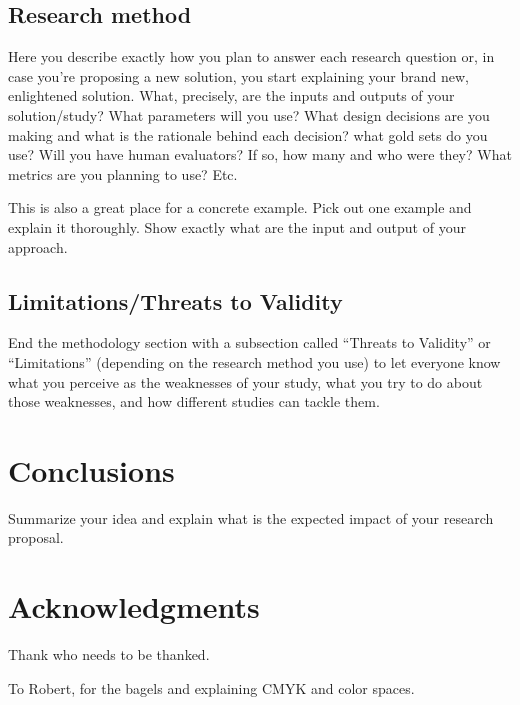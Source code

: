 \documentclass[sigconf,screen]{acmart}
\begin{document}
\subsection{Research method}

Here you describe exactly how you plan to answer each research question or, in case you're proposing a new solution, you start explaining your brand new, enlightened solution. What, precisely, are the inputs and outputs of your solution/study? What parameters will you use? What design decisions are you making and what is the rationale behind each decision? what gold sets do you use? Will you have human evaluators? If so, how many and who were they? What metrics are you planning to use?  Etc.

This is also a great place for a concrete example. Pick out one example and explain it thoroughly. Show exactly what are the input and output of your approach.

\subsection{Limitations/Threats to Validity}

End the methodology section with a subsection called ``Threats to Validity'' or ``Limitations'' (depending on the research method you use) to let everyone know what you perceive as the weaknesses of your study, what you try to do about those weaknesses, and how different studies can tackle them.

\section{Conclusions}
Summarize your idea and explain what is the expected impact of your research proposal.



\section{Acknowledgments}

Thank who needs to be thanked.


\begin{acks}
To Robert, for the bagels and explaining CMYK and color spaces.
\end{acks}
\end{document}
